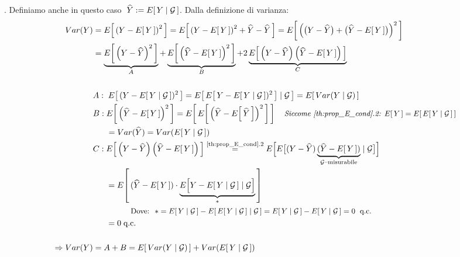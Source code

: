 \begin{teorema}
\begin{dimostrazione}
        \bigskip
        . Definiamo anche in questo caso $\;\widehat{Y} := E\!\left[\,Y\mid \mathcal{G}\,\right]$. Dalla definizione di varianza:
        \begin{align*}
            Var(Y) & = \E{\left(Y-\E{Y}\right)^2} = \E{\left(Y-\E{Y}\right)^2 + \widehat{Y} - \widehat{Y}} = \E{\left(\bigl(Y-\widehat{Y}\bigr) + \bigl(\widehat{Y} - \E{Y}\bigr)\right)^2} \\
            & = \underbrace{\E{\left(Y-\widehat{Y}\right)^2}}_A + \underbrace{\E{\left(\widehat{Y} - \E{Y}\right)^2}}_B + 2 \underbrace{\E{\left(Y-\widehat{Y}\right) \left(\widehat{Y} - \E{Y}\right)}}_C \\
            \\
            & A:\; \E{(Y - \E{Y\mid\mathcal{G}})^2} = \E{\E{Y - \E{Y\mid\mathcal{G}})^2}\mid\mathcal{G}} = \E{Var(Y\mid \mathcal{G})}\\
            & \begin{aligned}
                B: \; & \E{\left(\widehat{Y} - \E{Y}\right)^2} = \E{\E{\left(\widehat{Y} - \E{\widehat{Y}}\right)^2}}\quad \textit{\small Siccome \ref{th:prop_E_cond}.2:  $\E{Y} = \E{\E{Y\mid \mathcal{G}}}$}\\
                & =  Var(\widehat{Y}) = Var(\E{Y\mid \mathcal{G}})
            \end{aligned} \\
            & \begin{aligned}
                C:\; & \E{\left(Y-\widehat{Y}\right) \left(\widehat{Y} - \E{Y}\right)} \overset{\text{\ref{th:prop_E_cond}.2}}{=} E\Bigl[E\bigl[(Y-\widehat{Y}) \underbrace{(\widehat{Y} - \E{Y})}_{\mathcal{G}\text{--misurabile}}\mid\mathcal{G}\bigr]\Bigr]\\
                & = \E{(\widehat{Y} - \E{Y})\cdot \underbrace{E\Bigl[Y -\E{Y\mid \mathcal{G}}\mid \mathcal{G}\Bigr]}_{*}}\\
                & \qquad\quad  \text{\small $\text{Dove: }\; * = \E{Y\mid\mathcal{G}} - \E{\E{Y\mid \mathcal{G}}\mid \mathcal{G}} = \E{Y\mid\mathcal{G}} - \E{Y\mid\mathcal{G}} = 0 \; \text{ q.c.}$}\\
                & = 0 \;\text{q.c. }
            \end{aligned}\\
            \\
            \Rightarrow Var(Y) & = A+B = \E{Var(Y\mid\mathcal{G})} + Var(\E{Y\mid\mathcal{G}})
        \end{align*}
    \end{dimostrazione}
\end{teorema}

